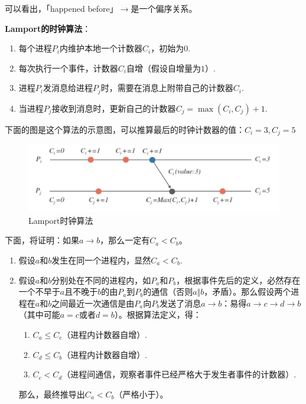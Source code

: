 \documentclass[cn,11pt,chinese]{elegantbook}
\providecommand{\tightlist}{%
  \setlength{\itemsep}{0pt}\setlength{\parskip}{0pt}}
\begin{document}
可以看出，「happened before」\(\rightarrow\)是一个偏序关系。

\textbf{Lamport的时钟算法}：

\begin{enumerate}
\def\labelenumi{\arabic{enumi}.}
\tightlist
\item
  每个进程\(P_i\)内维护本地一个计数器\(C_i\)，初始为\(0\).
\item
  每次执行一个事件，计数器\(C_i\)自增（假设自增量为\(1\)）.
\item
  进程\(P_i\)发消息给进程\(P_j\)时，需要在消息上附带自己的计数器\(C_i\).
\item
  当进程\(P_j\)接收到消息时，更新自己的计数器\(C_j = \max (C_i,C_j) + 1\).
\end{enumerate}

下面的图是这个算法的示意图，可以推算最后的时钟计数器的值：\(C_i = 3, C_j = 5\)

\begin{figure}
\centering
\includegraphics{images/appendix-a-10.jpeg}
\caption{Lamport时钟算法}
\end{figure}

下面，将证明：如果\(a \rightarrow b\)，那么一定有\(C_a < C_b\)。

\begin{enumerate}
\def\labelenumi{\arabic{enumi}.}
\tightlist
\item
  假设\(a\)和\(b\)发生在同一个进程内，显然\(C_a < C_b\).
\item
  假设\(a\)和\(b\)分别处在不同的进程内，如\(P_a\)和\(P_b\)，根据事件先后的定义，必然存在一个不早于\(a\)且不晚于\(b\)的由\(P_a\)到\(P_b\)的通信（否则\(a \Vert b\)，矛盾）。那么假设两个进程在\(a\)和\(b\)之间最近一次通信是由\(P_a\)向\(P_b\)发送了消息\(a \rightarrow b\)：易得\(a \rightarrow c \rightarrow d \rightarrow b\)（其中可能\(a = c\)或者\(d = b\)）。根据算法定义，得：

  \begin{enumerate}
  \def\labelenumii{\arabic{enumii}.}
  \tightlist
  \item
    \(C_a \leq C_c\)（进程内计数器自增）.
  \item
    \(C_d \leq C_b\)（进程内计数器自增）.
  \item
    \(C_c < C_d\)（进程间通信，观察者事件已经严格大于发生者事件的计数器）.
  \end{enumerate}

  那么，最终推导出\(C_a < C_b\)（严格小于）。
\end{enumerate}
\end{document}
